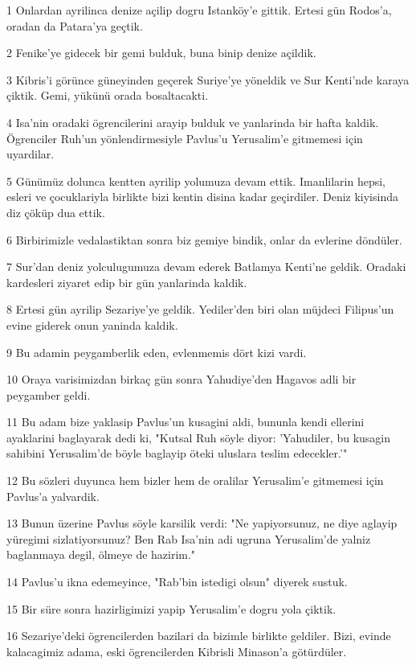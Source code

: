 \par 1 Onlardan ayrilinca denize açilip dogru Istanköy'e gittik. Ertesi gün Rodos'a, oradan da Patara'ya geçtik.
\par 2 Fenike'ye gidecek bir gemi bulduk, buna binip denize açildik.
\par 3 Kibris'i görünce güneyinden geçerek Suriye'ye yöneldik ve Sur Kenti'nde karaya çiktik. Gemi, yükünü orada bosaltacakti.
\par 4 Isa'nin oradaki ögrencilerini arayip bulduk ve yanlarinda bir hafta kaldik. Ögrenciler Ruh'un yönlendirmesiyle Pavlus'u Yerusalim'e gitmemesi için uyardilar.
\par 5 Günümüz dolunca kentten ayrilip yolumuza devam ettik. Imanlilarin hepsi, esleri ve çocuklariyla birlikte bizi kentin disina kadar geçirdiler. Deniz kiyisinda diz çöküp dua ettik.
\par 6 Birbirimizle vedalastiktan sonra biz gemiye bindik, onlar da evlerine döndüler.
\par 7 Sur'dan deniz yolculugumuza devam ederek Batlamya Kenti'ne geldik. Oradaki kardesleri ziyaret edip bir gün yanlarinda kaldik.
\par 8 Ertesi gün ayrilip Sezariye'ye geldik. Yediler'den biri olan müjdeci Filipus'un evine giderek onun yaninda kaldik.
\par 9 Bu adamin peygamberlik eden, evlenmemis dört kizi vardi.
\par 10 Oraya varisimizdan birkaç gün sonra Yahudiye'den Hagavos adli bir peygamber geldi.
\par 11 Bu adam bize yaklasip Pavlus'un kusagini aldi, bununla kendi ellerini ayaklarini baglayarak dedi ki, "Kutsal Ruh söyle diyor: 'Yahudiler, bu kusagin sahibini Yerusalim'de böyle baglayip öteki uluslara teslim edecekler.'"
\par 12 Bu sözleri duyunca hem bizler hem de oralilar Yerusalim'e gitmemesi için Pavlus'a yalvardik.
\par 13 Bunun üzerine Pavlus söyle karsilik verdi: "Ne yapiyorsunuz, ne diye aglayip yüregimi sizlatiyorsunuz? Ben Rab Isa'nin adi ugruna Yerusalim'de yalniz baglanmaya degil, ölmeye de hazirim."
\par 14 Pavlus'u ikna edemeyince, "Rab'bin istedigi olsun" diyerek sustuk.
\par 15 Bir süre sonra hazirligimizi yapip Yerusalim'e dogru yola çiktik.
\par 16 Sezariye'deki ögrencilerden bazilari da bizimle birlikte geldiler. Bizi, evinde kalacagimiz adama, eski ögrencilerden Kibrisli Minason'a götürdüler.
